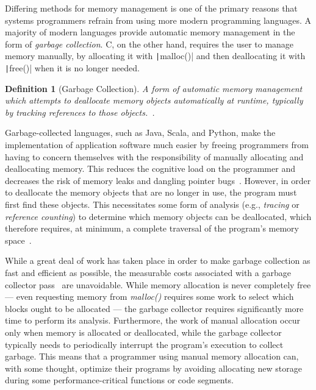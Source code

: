 \documentclass[11pt,a4paper]{article}
\theoremstyle{break}
\newtheorem{defn}{Definition}
\begin{document}
Differing methods for memory management is one of the primary reasons that systems programmers refrain from using more modern programming languages. A majority of modern languages provide automatic memory management in the form of \textit{garbage collection}. C, on the other hand, requires the user to manage memory manually, by allocating it with \texttt|malloc()| and then deallocating it with \texttt|free()| when it is no longer needed.

\begin{defn}[Garbage Collection]
A form of automatic memory management which attempts to deallocate memory objects automatically at runtime, typically by tracking references to those objects.~\cite{Bartley:2003:GC:1074100.1074419,Dijkstra:1978:OGC:359642.359655}.
\end{defn}

Garbage-collected languages, such as Java, Scala, and Python, make the implementation of application software much easier by freeing programmers from having to concern themselves with the responsibility of manually allocating and deallocating memory. This reduces the cognitive load on the programmer and decreases the risk of memory leaks and dangling pointer bugs~\cite{Hertz:2005:QPG:1094811.1094836,Dijkstra:1978:OGC:359642.359655}. However, in order to deallocate the memory objects that are no longer in use, the program must first find these objects. This necessitates some form of analysis (e.g., \textit{tracing} or \textit{reference counting}) to determine which memory objects can be deallocated, which therefore requires, at minimum, a complete traversal of the program's memory space~\cite{Hertz:2005:QPG:1094811.1094836,Dijkstra:1978:OGC:359642.359655,Bartley:2003:GC:1074100.1074419}.

While a great deal of work has taken place in order to make garbage collection as fast and efficient as possible, the measurable costs associated with a garbage collector pass~\cite{Hertz:2005:QPG:1094811.1094836} are unavoidable. While memory allocation is never completely free --- even requesting memory from \textit{malloc()} requires some work to select which blocks ought to be allocated --- the garbage collector requires significantly more time to perform its analysis. Furthermore, the work of manual allocation occur only when memory is allocated or deallocated, while the garbage collector typically needs to periodically interrupt the program's execution to collect garbage. This means that a programmer using manual memory allocation can, with some thought, optimize their programs by avoiding allocating new storage during some performance-critical functions or code segments.
\end{document}
